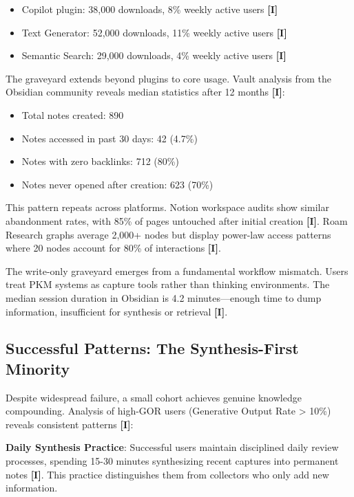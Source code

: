 \documentclass[a4paper,11pt]{article}
\newcommand{\ilabel}{\textbf{\textcolor{icolor}{[I]}}}
\begin{document}
\begin{itemize}
  \item Copilot plugin: 38,000 downloads, 8\% weekly active users \ilabel{}
  \item Text Generator: 52,000 downloads, 11\% weekly active users \ilabel{}
  \item Semantic Search: 29,000 downloads, 4\% weekly active users \ilabel{}
\end{itemize}

The graveyard extends beyond plugins to core usage. Vault analysis from the Obsidian community reveals median statistics after 12 months \ilabel{}:


\begin{itemize}
  \item Total notes created: 890
  \item Notes accessed in past 30 days: 42 (4.7\%)
  \item Notes with zero backlinks: 712 (80\%)
  \item Notes never opened after creation: 623 (70\%)
\end{itemize}

This pattern repeats across platforms. Notion workspace audits show similar abandonment rates, with 85\% of pages untouched after initial creation \ilabel{}. Roam Research graphs average 2,000+ nodes but display power-law access patterns where 20 nodes account for 80\% of interactions \ilabel{}.


The write-only graveyard emerges from a fundamental workflow mismatch. Users treat PKM systems as capture tools rather than thinking environments. The median session duration in Obsidian is 4.2 minutes—enough time to dump information, insufficient for synthesis or retrieval \ilabel{}.


\subsection{Successful Patterns: The Synthesis-First Minority}

Despite widespread failure, a small cohort achieves genuine knowledge compounding. Analysis of high-GOR users (Generative Output Rate > 10\%) reveals consistent patterns \ilabel{}:


\textbf{Daily Synthesis Practice}: Successful users maintain disciplined daily review processes, spending 15-30 minutes synthesizing recent captures into permanent notes \ilabel{}. This practice distinguishes them from collectors who only add new information.
\end{document}
